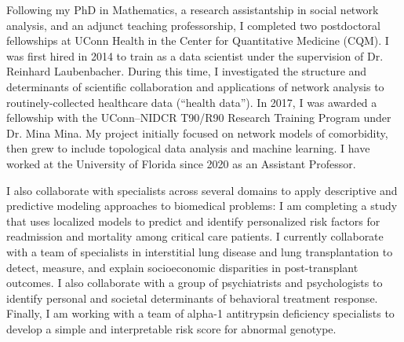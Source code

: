 \documentclass{nihbiosketch}
\begin{document}
\begin{statement}

Following my PhD in Mathematics, a research assistantship in social network analysis, and an adjunct teaching professorship, I completed two postdoctoral fellowships at UConn Health in the Center for Quantitative Medicine (CQM).
I was first hired in 2014 to train as a data scientist under the supervision of Dr. Reinhard Laubenbacher.
During this time, I investigated the structure and determinants of scientific collaboration and applications of network analysis to routinely-collected healthcare data (``health data'').
In 2017, I was awarded a fellowship with the UConn--NIDCR T90/R90 Research Training Program under Dr. Mina Mina. My project initially focused on network models of comorbidity, then grew to include topological data analysis and machine learning.
I have worked at the University of Florida since 2020 as an Assistant Professor.



I also collaborate with specialists across several domains to apply descriptive and predictive modeling approaches to biomedical problems:
I am completing a study that uses localized models to predict and identify personalized risk factors for readmission and mortality among critical care patients.
I currently collaborate with a team of specialists in interstitial lung disease and lung transplantation to detect, measure, and explain socioeconomic disparities in post-transplant outcomes.
I also collaborate with a group of psychiatrists and psychologists to identify personal and societal determinants of behavioral treatment response.
Finally, I am working with a team of alpha-1 antitrypsin deficiency specialists to develop a simple and interpretable risk score for abnormal genotype.




\end{statement}
\end{document}

